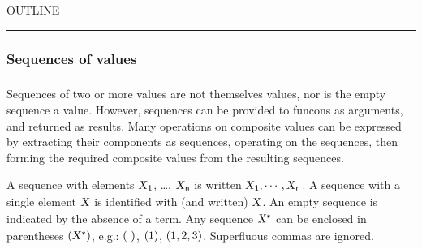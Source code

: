 


    OUTLINE
  \tableofcontents
\begin{center}
\rule{3in}{0.4pt}
\end{center}

\subsubsection{Sequences of values}\hypertarget{sequences-of-values}{}\label{sequences-of-values}

\begin{align*}
  [ \
  \KEY{Funcon} \quad & \NAMEREF{length} \\
  \KEY{Funcon} \quad & \NAMEREF{index} \\
  \KEY{Funcon} \quad & \NAMEREF{is-in} \\
  \KEY{Funcon} \quad & \NAMEREF{first} \\
  \KEY{Funcon} \quad & \NAMEREF{second} \\
  \KEY{Funcon} \quad & \NAMEREF{third} \\
  \KEY{Funcon} \quad & \NAMEREF{first-n} \\
  \KEY{Funcon} \quad & \NAMEREF{drop-first-n} \\
  \KEY{Funcon} \quad & \NAMEREF{reverse} \\
  \KEY{Funcon} \quad & \NAMEREF{n-of} \\
  \KEY{Funcon} \quad & \NAMEREF{intersperse}
  \ ]
\end{align*}
Sequences of two or more values are not themselves values, nor is the empty
  sequence a value. However, sequences can be provided to funcons as arguments,
  and returned as results. Many operations on composite values can be expressed
  by extracting their components as sequences, operating on the sequences, then
  forming the required composite values from the resulting sequences.

A sequence with elements $\SHADE{\VAR{X}\SUB{1}}$, \ldots{}, $\SHADE{\VAR{X}\SUB{n}}$ is written $\SHADE{\VAR{X}\SUB{1}, \cdots, \VAR{X}\SUB{n}}$.
  A sequence with a single element $\SHADE{\VAR{X}}$ is identified with (and written) $\SHADE{\VAR{X}}$.
  An empty sequence is indicated by the absence of a term.
  Any sequence $\SHADE{\VAR{X}\STAR}$ can be enclosed in parentheses $\SHADE{(  \VAR{X}\STAR )}$, e.g.:
  $\strut(   \  )\strut$, $\strut(  1 )\strut$, $\strut(  1, 
                2, 
                3 )\strut$. Superfluous commas are ignored.

